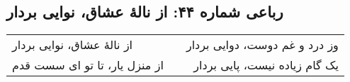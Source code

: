 \begin{center}
\section*{رباعی شماره ۴۴: از نالهٔ عشاق، نوایی بردار}
\label{sec:044}
\begin{longtable}{l p{0.5cm} r}
از نالهٔ عشاق، نوایی بردار
&&
وز درد و غم دوست، دوایی بردار
\\
از منزل یار، تا تو ای سست قدم
&&
یک گام زیاده نیست، پایی بردار
\\
\end{longtable}
\end{center}
